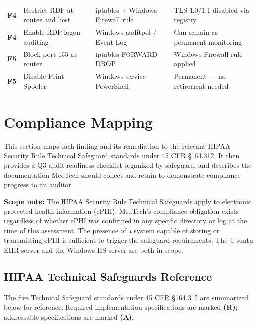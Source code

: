 \documentclass[12pt]{article}
\begin{document}
\begin{longtable}{>{\bfseries}p{1.0cm} p{3.0cm} p{2.8cm} p{3.8cm}}
  F4 &
  Restrict RDP at router and host &
  iptables + Windows Firewall rule &
  TLS 1.0/1.1 disabled via registry \\[4pt]
 
  F4 &
  Enable RDP logon auditing &
  Windows auditpol / Event Log &
  Can remain as permanent monitoring \\[4pt]
 
  F5 &
  Block port 135 at router &
  iptables FORWARD DROP &
  Windows Firewall rule applied \\[4pt]
 
  F5 &
  Disable Print Spooler &
  Windows service --- PowerShell &
  Permanent --- no retirement needed \\[4pt]
 
  \bottomrule
\end{longtable}

\section{Compliance Mapping}
This section maps each finding and its remediation to the relevant HIPAA
Security Rule Technical Safeguard standards under 45 CFR \S164.312. It then
provides a Q3 audit readiness checklist organized by safeguard, and describes
the documentation MedTech should collect and retain to demonstrate compliance
progress to an auditor.
 
\begin{notebox}
\textbf{Scope note:} The HIPAA Security Rule Technical Safeguards apply to
electronic protected health information (ePHI). MedTech's compliance
obligation exists regardless of whether ePHI was confirmed in any specific
directory or log at the time of this assessment. The presence of a system
capable of storing or transmitting ePHI is sufficient to trigger the
safeguard requirements. The Ubuntu EHR server and the Windows IIS server
are both in scope.
\end{notebox}
 
\subsection{HIPAA Technical Safeguards Reference}
 
The five Technical Safeguard standards under 45 CFR \S164.312 are summarized
below for reference. Required implementation specifications are marked
\textbf{(R)}; addressable specifications are marked \textbf{(A)}.
 
\end{document}
